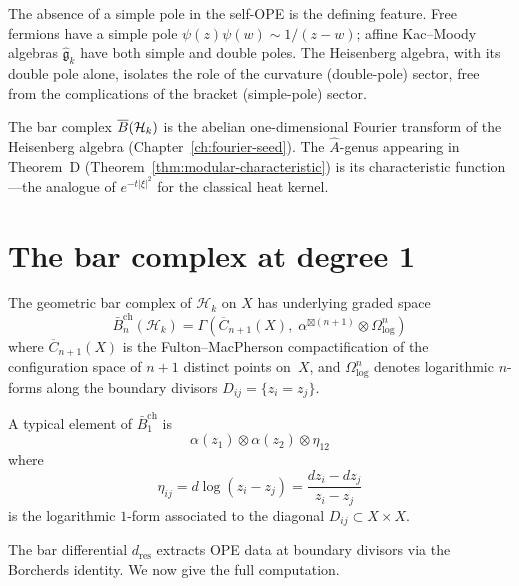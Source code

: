 The absence of a simple pole in the self-OPE is the defining feature.
Free fermions have a simple pole $\psi(z)\psi(w) \sim 1/(z-w)$; affine
Kac--Moody algebras $\widehat{\mathfrak{g}}_k$ have both simple and double
poles.  The Heisenberg algebra, with its double pole alone, isolates the
role of the curvature (double-pole) sector, free from the complications
of the bracket (simple-pole) sector.

\begin{remark}\label{rem:frame-fourier-identification}
The bar complex $\overline{B}(\mathcal{H}_k)$ is the abelian one-dimensional
Fourier transform of the Heisenberg algebra
(Chapter~\ref{ch:fourier-seed}).  The $\hat{A}$-genus appearing in
Theorem~D (Theorem~\ref{thm:modular-characteristic}) is its
characteristic function---the analogue of $e^{-t|\xi|^2}$ for the
classical heat kernel.
\end{remark}

\section{The bar complex at degree 1}\label{sec:frame-bar-deg1}

The geometric bar complex of $\mathcal{H}_k$ on $X$ has underlying
graded space
\begin{equation}\label{eq:frame-bar-graded}
\bar{B}^{\mathrm{ch}}_n(\mathcal{H}_k) = \Gamma\!\left(
  \overline{C}_{n+1}(X),\;
  \alpha^{\boxtimes(n+1)} \otimes \Omega^n_{\log}
\right)
\end{equation}
where $\overline{C}_{n+1}(X)$ is the Fulton--MacPherson compactification
of the configuration space of $n+1$ distinct points on~$X$, and
$\Omega^n_{\log}$ denotes logarithmic $n$-forms along the boundary
divisors $D_{ij} = \{z_i = z_j\}$.

A typical element of $\bar{B}^{\mathrm{ch}}_1$ is
\begin{equation}\label{eq:frame-bar1-element}
\alpha(z_1) \otimes \alpha(z_2) \otimes \eta_{12}
\end{equation}
where
\begin{equation}\label{eq:frame-eta-def}
\eta_{ij} = d\log(z_i - z_j) = \frac{dz_i - dz_j}{z_i - z_j}
\end{equation}
is the logarithmic $1$-form associated to the diagonal
$D_{ij} \subset X \times X$.

The bar differential $d_{\mathrm{res}}$ extracts OPE data at boundary
divisors via the Borcherds identity.  We now give the full computation.

